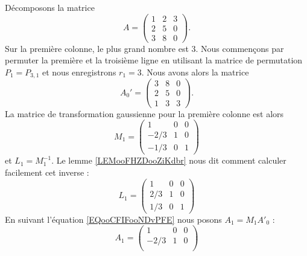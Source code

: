 \begin{example}
    Décomposons la matrice
    \begin{equation}
        A=\begin{pmatrix}
            1    &   2    &   3    \\
            2    &   5    &   0    \\
            3    &   8    &   0
        \end{pmatrix}.
    \end{equation}
    Sur la première colonne, le plus grand nombre est \( 3\). Nous commençons par permuter la première et la troisième ligne en utilisant la matrice de permutation \( P_1=P_{3,1}\) et nous enregistrons \( r_1=3\). Nous avons alors la matrice
    \begin{equation}
        A_0'=\begin{pmatrix}
            3    &   8    &   0    \\
            2    &   5    &   0    \\
            1    &   3    &   3
        \end{pmatrix}.
    \end{equation}
    La matrice de transformation gaussienne pour la première colonne est alors
    \begin{equation}
        M_1=\begin{pmatrix}
            1    &   0    &   0    \\
            -2/3    &   1    &   0    \\
            -1/3    &   0    &   1
        \end{pmatrix}
    \end{equation}
    et \( L_1=M_1^{-1}\). Le lemme \ref{LEMooFHZDooZiKdbr} nous dit comment calculer facilement cet inverse :
    \begin{equation}
        L_1=\begin{pmatrix}
            1    &   0    &   0    \\
            2/3    &   1    &   0    \\
            1/3    &   0    &   1
        \end{pmatrix}
    \end{equation}
    En suivant l'équation \eqref{EQooCFIFooNDvPFE} nous posons \( A_1=M_1A'_0\) :
    \begin{equation}
        A_1=
        \begin{pmatrix}
            1    &   0    &   0    \\
            -2/3    &   1    &   0    \\

\end{pmatrix}
\end{equation}
\end{example}
